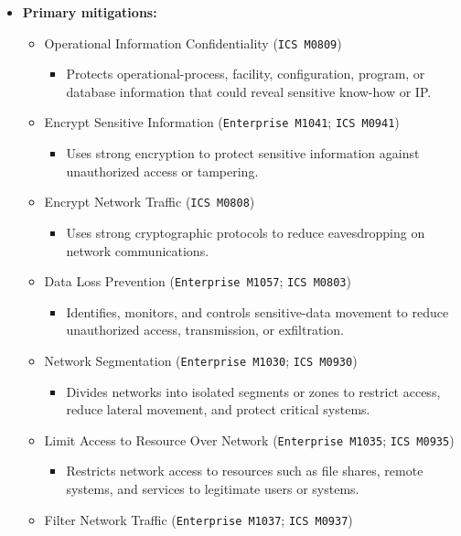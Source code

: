 \documentclass[10pt,a4paper,oneside]{report}
\begin{document}
\begin{itemize}
\item \textbf{Primary mitigations:}
\begin{itemize}
\item Operational Information Confidentiality (\texttt{ICS M0809})
\begin{itemize}
\item Protects operational-process, facility, configuration, program, or database information that could reveal sensitive know-how or IP.
\end{itemize}
\item Encrypt Sensitive Information (\texttt{Enterprise M1041}; \texttt{ICS M0941})
\begin{itemize}
\item Uses strong encryption to protect sensitive information against unauthorized access or tampering.
\end{itemize}
\item Encrypt Network Traffic (\texttt{ICS M0808})
\begin{itemize}
\item Uses strong cryptographic protocols to reduce eavesdropping on network communications.
\end{itemize}
\item Data Loss Prevention (\texttt{Enterprise M1057}; \texttt{ICS M0803})
\begin{itemize}
\item Identifies, monitors, and controls sensitive-data movement to reduce unauthorized access, transmission, or exfiltration.
\end{itemize}
\item Network Segmentation (\texttt{Enterprise M1030}; \texttt{ICS M0930})
\begin{itemize}
\item Divides networks into isolated segments or zones to restrict access, reduce lateral movement, and protect critical systems.
\end{itemize}
\item Limit Access to Resource Over Network (\texttt{Enterprise M1035}; \texttt{ICS M0935})
\begin{itemize}
\item Restricts network access to resources such as file shares, remote systems, and services to legitimate users or systems.
\end{itemize}
\item Filter Network Traffic (\texttt{Enterprise M1037}; \texttt{ICS M0937})

\end{itemize}
\end{itemize}
\end{document}
